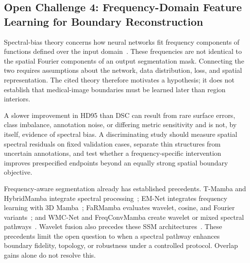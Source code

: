 \documentclass[5p,times,authoryear]{elsarticle}
\begin{document}
\subsection{Open Challenge 4: Frequency-Domain Feature Learning for Boundary Reconstruction}
\label{subsec:frequency}

Spectral-bias theory concerns how neural networks fit frequency components of functions defined over the input domain~\citep{jacot2018ntk,rahaman2019spectral,basri2019convergence,xu2020frequency}. These frequencies are not identical to the spatial Fourier components of an output segmentation mask. Connecting the two requires assumptions about the network, data distribution, loss, and spatial representation. The cited theory therefore motivates a hypothesis; it does not establish that medical-image boundaries must be learned later than region interiors.

A slower improvement in HD95 than DSC can result from rare surface errors, class imbalance, annotation noise, or differing metric sensitivity and is not, by itself, evidence of spectral bias. A discriminating study should measure spatial spectral residuals on fixed validation cases, separate thin structures from uncertain annotations, and test whether a frequency-specific intervention improves prespecified endpoints beyond an equally strong spatial boundary objective.

Frequency-aware segmentation already has established precedents. T-Mamba and HybridMamba integrate spectral processing~\citep{hao2026t,wu2025hybridmamba}; EM-Net integrates frequency learning with 3D Mamba~\citep{verified_chang2024emnet}; FaRMamba evaluates wavelet, cosine, and Fourier variants~\citep{verified_rong2025farmamba}; and WMC-Net and FreqConvMamba create wavelet or mixed spectral pathways~\citep{verified_fan2026wmcnet,verified_song2026freqconvmamba}. Wavelet fusion also precedes these SSM architectures~\citep{zhou2023xnet}. These precedents limit the open question to when a spectral pathway enhances boundary fidelity, topology, or robustness under a controlled protocol. Overlap gains alone do not resolve this.
\end{document}
